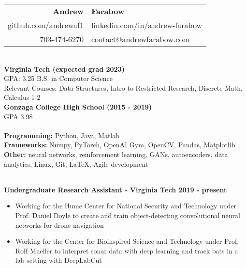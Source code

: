 \documentclass{article}
\begin{document}
  \begin{center}
    \begin{tabular}{r l}
      {\huge\textbf{Andrew}} & {\huge\textbf{Farabow}} \\
      \hspace{35pt} github.com/andrewaf1 & linkedin.com/in/andrew-farabow \\
      703-474-6270 & contact@andrewfarabow.com \\
    \end{tabular}


  \begin{flushleft}
    \begin{multicols}{2}
      {\large\textbf{\underline{}}} \\
      \textbf{Virginia Tech (expected grad 2023)} \\
      GPA: 3.25 \quad B.S. in Computer Science \\
      Relevant Courses: Data Structures, Intro to Restricted Research, Discrete Math, Calculus 1-2 \\
      \textbf{Gonzaga College High School	(2015 - 2019)} \\
      GPA 3.98 \\
     

    \columnbreak
    {\large\textbf{\underline{}}} \\
    {\textbf{Programming:}} Python, Java, Matlab \\
    {\textbf{Frameworks:}} Numpy, PyTorch, OpenAI Gym, OpenCV, Pandas, Matplotlib \\
    {\textbf{Other:}} neural networks, reinforcement learning, GANs, autoencoders, data analytics, Linux, Git, LaTeX, Agile development \\

    \end{multicols}

    {\large\textbf{\underline{}}} \\
    \textbf{Undergraduate Research Assistant - Virginia Tech \hfill 2019 - present}
    \begin{itemize}
      \itemsep0em
      \item Working for the Hume Center for National Security and Technology under Prof. Daniel Doyle to create and train object-detecting convolutional neural networks for drone navigation
      \item Working for the Center for Bioinspired Science and Technology under Prof. Rolf Mueller to interpret sonar data with deep learning and track bats in a lab setting with DeepLabCut
    \end{itemize}



\end{flushleft}
\end{center}
\end{document}
